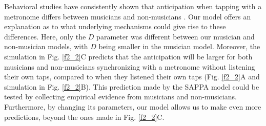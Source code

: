 \documentclass{report}
\begin{document}
Behavioral studies have consistently shown that anticipation when tapping with a metronome differs between musicians and non-musicians \cite{mates1994temporal, repp2007tapping, miyake2004two}. Our model offers an explanation as to what underlying mechanisms could give rise to these differences. Here, only the $D$ parameter was different between our musician and non-musician models, with $D$ being smaller in the musician model. Moreover, the simulation in Fig.{} \ref{f2_2}C predicts that the anticipation will be larger for both musicians and non-musicians synchronizing with a metronome without listening their own taps, compared to when they listened their own taps (Fig.{} \ref{f2_2}A and simulation in Fig.{} \ref{f2_2}B). This prediction made by the SAPPA model could be tested by collecting empirical evidence from musicians and non-musicians. Furthermore, by changing its parameters, our model allows us to make even more predictions, beyond the ones made in Fig.{} \ref{f2_2}C.
\end{document}
